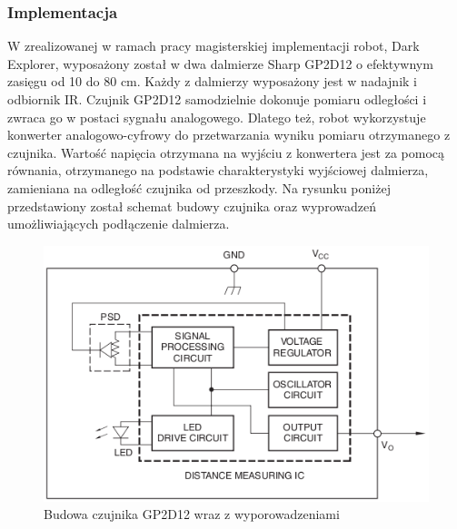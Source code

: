 \subsubsection{Implementacja}
W zrealizowanej w ramach pracy magisterskiej implementacji robot, Dark Explorer,
wyposażony został w dwa dalmierze Sharp GP2D12 o efektywnym zasięgu od 10 do 80
cm. Każdy z dalmierzy wyposażony jest w nadajnik i odbiornik IR. Czujnik
GP2D12 samodzielnie dokonuje pomiaru odległości i zwraca go w postaci sygnału
analogowego. Dlatego też, robot wykorzystuje konwerter analogowo-cyfrowy do
przetwarzania wyniku pomiaru otrzymanego z czujnika. Wartość napięcia otrzymana
na wyjściu z konwertera jest za pomocą równania, otrzymanego na podstawie
charakterystyki wyjściowej dalmierza, zamieniana na odległość czujnika od
przeszkody. Na rysunku poniżej przedstawiony został schemat budowy czujnika oraz
wyprowadzeń umożliwiających podłączenie dalmierza.

\begin{figure}[hb]
 \centering
 \includegraphics[width=150mm]{../images/ch04/gp2d12_build.png}
 \caption{Budowa czujnika GP2D12 wraz z wyporowadzeniami\cite{GP2D12DataSheet}}
 \label{fig:SharpGP2D12}
\end{figure}

